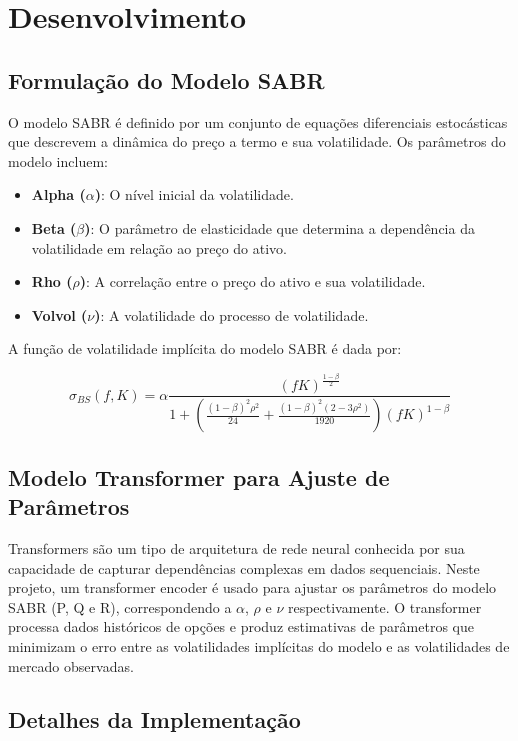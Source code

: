 \section{Desenvolvimento}
\subsection{Formulação do Modelo SABR}

O modelo SABR é definido por um conjunto de equações diferenciais estocásticas que descrevem a dinâmica do preço a termo e sua volatilidade. Os parâmetros do modelo incluem:
\begin{itemize}
	\item \textbf{Alpha (\(\alpha\))}: O nível inicial da volatilidade.
	\item \textbf{Beta (\(\beta\))}: O parâmetro de elasticidade que determina a dependência da volatilidade em relação ao preço do ativo.
	\item \textbf{Rho (\(\rho\))}: A correlação entre o preço do ativo e sua volatilidade.
	\item \textbf{Volvol (\(\nu\))}: A volatilidade do processo de volatilidade.
\end{itemize}

A função de volatilidade implícita do modelo SABR é dada por:

\begin{equation}
	\sigma_{\textit{BS}}(f, K) = 
	\alpha \frac{(fK)^{\frac{1 - \beta}{2}}}{1 + \left(\frac{(1 - \beta)^2 \rho^2}{24} + \frac{(1 - \beta)^2(2 - 3\rho^2)}{1920} \right) (fK)^{1 - \beta}}
\end{equation}

\subsection{Modelo Transformer para Ajuste de Parâmetros}

Transformers são um tipo de arquitetura de rede neural conhecida por sua capacidade de capturar dependências complexas em dados sequenciais. Neste projeto, um transformer encoder é usado para ajustar os parâmetros do modelo SABR (P, Q e R), correspondendo a \(\alpha\), \(\rho\) e \(\nu\) respectivamente. O transformer processa dados históricos de opções e produz estimativas de parâmetros que minimizam o erro entre as volatilidades implícitas do modelo e as volatilidades de mercado observadas.

\subsection{Detalhes da Implementação}

